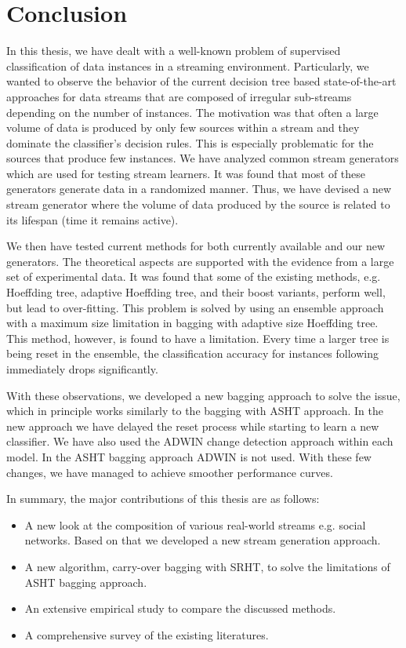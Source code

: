 \chapter{Conclusion}
\label{chp:conclude}

In this thesis, we have dealt with a well-known problem of supervised classification of data instances in a streaming environment. Particularly, we wanted to observe the behavior of the current decision tree based state-of-the-art approaches for data streams that are composed of irregular sub-streams depending on the number of instances. The motivation was that often a large volume of data is produced by only few sources within a stream and they dominate the classifier's decision rules. This is especially problematic for the sources that produce few instances. We have analyzed common stream generators which are used for testing stream learners. It was found that most of these generators generate data in a randomized manner. Thus, we have devised a new stream generator where the volume of data produced by the source is  related to its lifespan (time it remains active). 

We then have tested current methods for both currently available and our new generators. The theoretical aspects are supported with the evidence from a large set of experimental data. It was found that some of the existing methods, e.g. Hoeffding tree, adaptive Hoeffding tree, and their boost variants, perform well, but lead to over-fitting. This problem is solved by using an ensemble approach with a maximum size limitation in bagging with adaptive size Hoeffding tree. This method, however, is found to have a limitation. Every time a larger tree is being reset in the ensemble, the classification accuracy for instances following immediately drops significantly. 

With these observations, we developed a new bagging approach  to solve the issue, which in principle works similarly to the bagging with ASHT approach. In the new approach we have delayed the reset process while starting to learn a new classifier. We have also used the ADWIN change detection approach within each model. In the ASHT bagging approach ADWIN is not used. With these few changes, we have managed to achieve smoother performance curves.

In summary, the major contributions of this thesis are as follows:

\begin{itemize}
    \item A new look at the composition of various real-world streams e.g. social networks. Based on that we developed a new stream generation approach.
    
    \item A new algorithm, carry-over bagging with SRHT, to solve the limitations of ASHT bagging approach.
    
    \item An extensive empirical study to compare the discussed methods.
    
    \item A comprehensive survey of the existing literatures.
\end{itemize}

